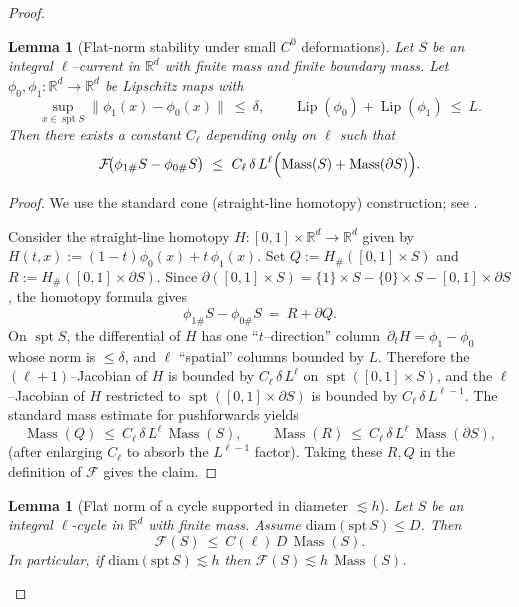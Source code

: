 \documentclass[11pt]{article}
\numberwithin{equation}{section}  %
\theoremstyle{plain}
\newtheorem{lemma}[theorem]{Lemma}
\theoremstyle{definition}
\theoremstyle{remark}
\DeclareMathOperator{\spt}{spt}
\DeclareMathOperator{\Lip}{Lip}
\newcommand{\R}{\mathbb{R}}
\DeclareMathOperator{\Mass}{Mass}
\begin{document}
\begin{proof}
\begin{lemma}[Flat-norm stability under small $C^0$ deformations]\label{lem:flat-C0-deform}
Let $S$ be an integral $\ell$--current in $\R^d$ with finite mass and finite boundary mass.
Let $\phi_0,\phi_1:\R^d\to\R^d$ be Lipschitz maps with
\[
\sup_{x\in\spt S}\|\phi_1(x)-\phi_0(x)\|\ \le\ \delta,
\qquad
\Lip(\phi_0)+\Lip(\phi_1)\ \le\ L.
\]
Then there exists a constant $C_\ell$ depending only on $\ell$ such that
\[
\mathcal F\!\bigl(\phi_{1\#}S-\phi_{0\#}S\bigr)\ \le\ C_\ell\,\delta\,L^{\ell}\Bigl(\Mass(S)+\Mass(\partial S)\Bigr).
\]
\end{lemma}

\begin{proof}
We use the standard cone (straight-line homotopy) construction; see \cite{Fed69}.

Consider the straight-line homotopy $H:[0,1]\times\R^d\to\R^d$ given by
$H(t,x):=(1-t)\phi_0(x)+t\,\phi_1(x)$.
Set $Q:=H_\#([0,1]\times S)$ and $R:=H_\#([0,1]\times \partial S)$.
Since $\partial([0,1]\times S)=\{1\}\times S-\{0\}\times S-[0,1]\times\partial S$, the homotopy formula gives
\[
\phi_{1\#}S-\phi_{0\#}S\ =\ R+\partial Q.
\]
On $\spt S$, the differential of $H$ has one ``$t$--direction'' column $\,\partial_t H=\phi_1-\phi_0\,$ whose norm is $\le\delta$,
and $\ell$ ``spatial'' columns bounded by $L$.
Therefore the $(\ell+1)$--Jacobian of $H$ is bounded by $C_\ell\,\delta\,L^\ell$ on $\spt([0,1]\times S)$, and the $\ell$--Jacobian
of $H$ restricted to $\spt([0,1]\times\partial S)$ is bounded by $C_\ell\,\delta\,L^{\ell-1}$.
The standard mass estimate for pushforwards yields
\[
\Mass(Q)\ \le\ C_\ell\,\delta\,L^\ell\,\Mass(S),
\qquad
\Mass(R)\ \le\ C_\ell\,\delta\,L^\ell\,\Mass(\partial S),
\]
(after enlarging $C_\ell$ to absorb the $L^{\ell-1}$ factor).
Taking these $R,Q$ in the definition of $\mathcal F$ gives the claim.
\end{proof}

\begin{lemma}[Flat norm of a cycle supported in diameter $\lesssim h$]\label{lem:flat-diameter}
Let $S$ be an integral $\ell$-cycle in $\R^d$ with finite mass.
Assume $\mathrm{diam}(\mathrm{spt}\,S)\le D$.
Then
\[
\mathcal F(S)\ \le\ C(\ell)\,D\,\Mass(S).
\]
In particular, if $\mathrm{diam}(\mathrm{spt}\,S)\lesssim h$ then $\mathcal F(S)\lesssim h\,\Mass(S)$.
\end{lemma}


\end{proof}
\end{document}
